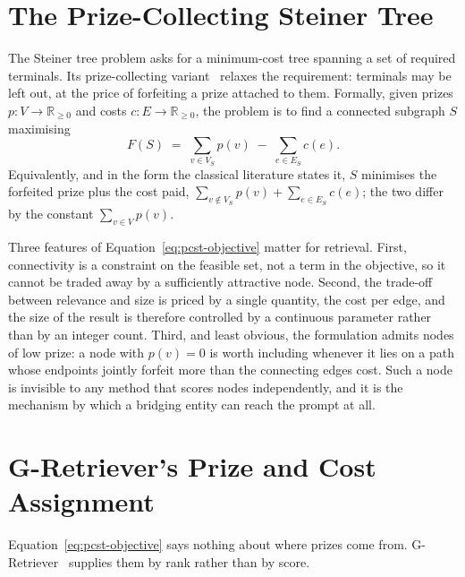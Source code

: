 \section{The Prize-Collecting Steiner Tree} \label{sec:pcst-definition}

The Steiner tree problem asks for a minimum-cost tree spanning a set of required
terminals. Its prize-collecting variant~\cite{bienstock1993pcst} relaxes the
requirement: terminals may be left out, at the price of forfeiting a prize
attached to them. Formally, given prizes $p: V \to \mathbb{R}_{\geq 0}$ and costs
$c: E \to \mathbb{R}_{\geq 0}$, the problem is to find a connected subgraph $S$
maximising
%
\begin{equation}
F(S) \;=\; \sum_{v \in V_S} p(v) \;-\; \sum_{e \in E_S} c(e).
\label{eq:pcst-objective}
\end{equation}
%
Equivalently, and in the form the classical literature states it, $S$ minimises
the forfeited prize plus the cost paid,
$\sum_{v \notin V_S} p(v) + \sum_{e \in E_S} c(e)$; the two differ by the
constant $\sum_{v \in V} p(v)$.

Three features of Equation~\ref{eq:pcst-objective} matter for retrieval. First,
connectivity is a constraint on the feasible set, not a term in the objective, so
it cannot be traded away by a sufficiently attractive node. Second, the trade-off
between relevance and size is priced by a single quantity, the cost per edge, and
the size of the result is therefore controlled by a continuous parameter rather
than by an integer count. Third, and least obvious, the formulation admits nodes
of low prize: a node with $p(v) = 0$ is worth including whenever it lies on a path
whose endpoints jointly forfeit more than the connecting edges cost. Such a node
is invisible to any method that scores nodes independently, and it is the
mechanism by which a bridging entity can reach the prompt at all.

\section{G-Retriever's Prize and Cost Assignment} \label{sec:gretriever-prizes}

Equation~\ref{eq:pcst-objective} says nothing about where prizes come from.
G-Retriever~\cite{he2024gretriever} supplies them by rank rather than by score.

